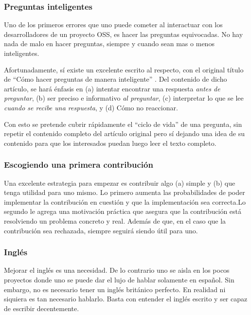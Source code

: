 \subsubsection*{Preguntas inteligentes}

Uno de los primeros errores que uno puede cometer al interactuar con los
desarrolladores de un proyecto OSS, es hacer las preguntas equivocadas. No hay
nada de malo en hacer preguntas, siempre y cuando sean mas o menos inteligentes.

Afortunadamente, sí existe un excelente escrito al respecto, con el original
título de ``Cómo hacer preguntas de manera inteligente''
\cite{PreguntasInteligentes}. Del contenido de dicho artículo, se hará énfasis
en (a) intentar encontrar una respuesta \emph{antes de preguntar}, (b) ser
preciso e informativo \emph{al preguntar}, (c) interpretar lo que se lee
\emph{cuando se recibe una respuesta}, y (d) Cómo no reaccionar.

Con esto se pretende cubrir rápidamente el ``ciclo de vida'' de una pregunta,
sin repetir el contenido completo del artículo original pero sí dejando una idea
de su contenido para que los interesados puedan luego leer el texto completo.

\subsubsection*{Escogiendo una primera contribución}

Una excelente estrategia para empezar es contribuir algo (a) simple y (b) que
tenga utilidad para uno mismo. Lo primero aumenta las probabilidades de poder
implementar la contribución en cuestión y que la implementación sea correcta.Lo
segundo le agrega una motivación práctica que asegura que la contribución está
resolviendo un problema concreto y real. Además de que, en el caso que la
contribución sea rechazada, siempre seguirá siendo útil para uno.

\subsubsection*{Inglés}

Mejorar el inglés es una necesidad. De lo contrario uno se aisla en los pocos
proyectos donde uno se puede dar el lujo de hablar solamente en español. Sin
embargo, no es necesario tener un inglés británico perfecto. En realidad ni
siquiera es tan necesario hablarlo. Basta con entender el inglés escrito y ser
capaz de escribir decentemente.

